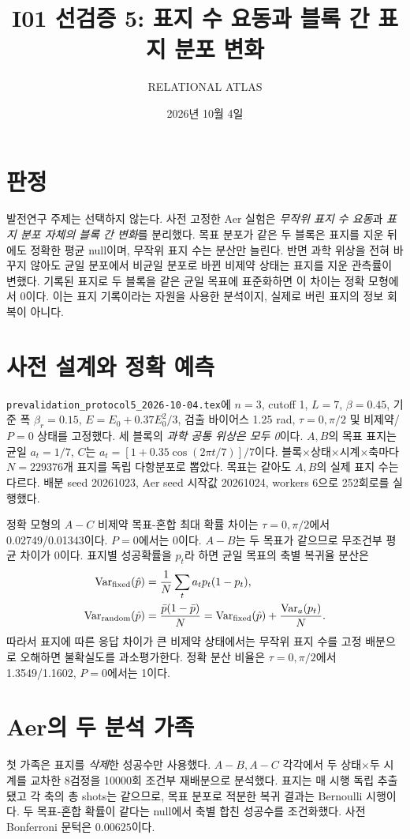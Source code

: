 \documentclass[11pt,a4paper]{article}
\title{I01 선검증 5: 표지 수 요동과 블록 간 표지 분포 변화}
\author{RELATIONAL ATLAS}
\date{2026년 10월 4일}
\begin{document}
\maketitle

\section{판정}
발전연구 주제는 선택하지 않는다. 사전 고정한 Aer 실험은
\emph{무작위 표지 수 요동}과 \emph{표지 분포 자체의 블록 간 변화}를
분리했다. 목표 분포가 같은 두 블록은 표지를 지운 뒤에도
정확한 평균 null이며, 무작위 표지 수는 분산만 늘린다.
반면 과학 위상을 전혀 바꾸지 않아도 균일 분포에서 비균일
분포로 바뀐 비제약 상태는 표지를 지운 관측률이 변했다.
기록된 표지로 두 블록을 같은 균일 목표에 표준화하면 이
차이는 정확 모형에서 0이다. 이는 표지 기록이라는 자원을
사용한 분석이지, 실제로 버린 표지의 정보 회복이 아니다.

\section{사전 설계와 정확 예측}
\texttt{prevalidation\_protocol5\_2026-10-04.tex}에
$n=3$, cutoff 1, $L=7$, $\beta=0.45$, 기준 폭 $\beta_r=0.15$,
$E=E_0+0.37E_0^2/3$, 검출 바이어스 1.25 rad,
$\tau=0,\pi/2$ 및 비제약/$P=0$ 상태를 고정했다.
세 블록의 \emph{과학 공통 위상은 모두 0}이다.
$A,B$의 목표 표지는 균일 $a_t=1/7$,
$C$는 $a_t=[1+0.35\cos(2\pi t/7)]/7$이다.
블록$\times$상태$\times$시계$\times$축마다 $N=229376$개 표지를
독립 다항분포로 뽑았다. 목표는 같아도 $A,B$의 실제 표지 수는 다르다.
배분 seed 20261023, Aer seed 시작값 20261024,
workers 6으로 252회로를 실행했다.

정확 모형의 $A-C$ 비제약 목표-혼합 최대 확률 차이는
$\tau=0,\pi/2$에서 0.02749/0.01343이다.
$P=0$에서는 0이다. $A-B$는 두 목표가 같으므로
무조건부 평균 차이가 0이다. 표지별 성공확률을 $p_t$라 하면
균일 목표의 축별 복귀율 분산은
\begin{align}
\operatorname{Var}_{\rm fixed}(\hat p)
 &=\frac1N\sum_t a_t p_t(1-p_t),\\
\operatorname{Var}_{\rm random}(\hat p)
 &=\frac{\bar p(1-\bar p)}{N}
 =\operatorname{Var}_{\rm fixed}(\hat p)
 +\frac{\operatorname{Var}_{a}(p_t)}{N}.
\end{align}
따라서 표지에 따른 응답 차이가 큰 비제약 상태에서는
무작위 표지 수를 고정 배분으로 오해하면 불확실도를 과소평가한다.
정확 분산 비율은 $\tau=0,\pi/2$에서 1.3549/1.1602,
$P=0$에서는 1이다.

\section{Aer의 두 분석 가족}
첫 가족은 표지를 \emph{삭제}한 성공수만 사용했다.
$A-B,A-C$ 각각에서 두 상태$\times$두 시계를 교차한
8검정을 10000회 조건부 재배분으로 분석했다. 표지는 매 시행
독립 추출됐고 각 축의 총 shots는 같으므로, 목표 분포로 적분한
복귀 결과는 Bernoulli 시행이다. 두 목표-혼합 확률이 같다는
null에서 축별 합친 성공수를 조건화했다. 사전 Bonferroni
문턱은 $0.00625$이다.
\end{document}
